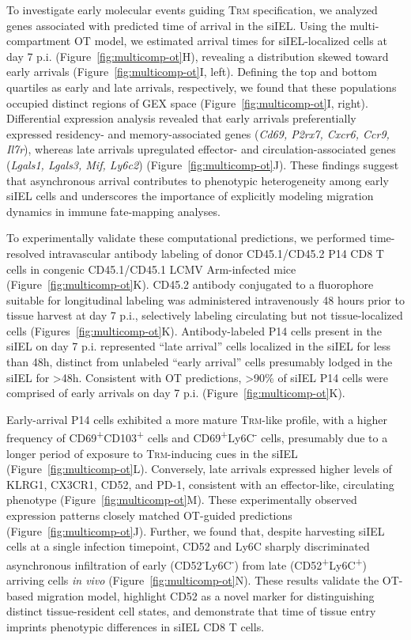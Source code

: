 To investigate early molecular events guiding T\textsc{rm} specification, we analyzed genes associated with predicted time of arrival in the siIEL. Using the multi-compartment OT model, we estimated arrival times for siIEL-localized cells at day 7 p.i. (Figure~\ref{fig:multicomp-ot}H), revealing a distribution skewed toward early arrivals (Figure~\ref{fig:multicomp-ot}I, left). Defining the top and bottom quartiles as early and late arrivals, respectively, we found that these populations occupied distinct regions of GEX space (Figure~\ref{fig:multicomp-ot}I, right). Differential expression analysis revealed that early arrivals preferentially expressed residency- and memory-associated genes (\emph{Cd69, P2rx7, Cxcr6, Ccr9, Il7r}), whereas late arrivals upregulated effector- and circulation-associated genes (\emph{Lgals1, Lgals3, Mif, Ly6c2}) (Figure~\ref{fig:multicomp-ot}J). These findings suggest that asynchronous arrival contributes to phenotypic heterogeneity among early siIEL cells and underscores the importance of explicitly modeling migration dynamics in immune fate-mapping analyses.

To experimentally validate these computational predictions, we performed time-resolved intravascular antibody labeling of donor CD45.1/CD45.2 P14 CD8 T cells in congenic CD45.1/CD45.1 LCMV Arm-infected mice (Figure~\ref{fig:multicomp-ot}K). CD45.2 antibody conjugated to a fluorophore suitable for longitudinal labeling \citep{shanahanLongitudinalIntravascularAntibody2024} was administered intravenously 48 hours prior to tissue harvest at day 7 p.i., selectively labeling circulating but not tissue-localized cells (Figures~\ref{fig:multicomp-ot}K). Antibody-labeled P14 cells present in the siIEL on day 7 p.i. represented ``late arrival'' cells localized in the siIEL for less than 48h, distinct from unlabeled ``early arrival'' cells presumably lodged in the siIEL for \textgreater{}48h. Consistent with OT predictions, \textgreater{}90\% of siIEL P14 cells were comprised of early arrivals on day 7 p.i. (Figure~\ref{fig:multicomp-ot}K).

Early-arrival P14 cells exhibited a more mature T\textsc{rm}-like profile, with a higher frequency of CD69\textsuperscript{+}CD103\textsuperscript{+} cells and CD69\textsuperscript{+}Ly6C\textsuperscript{-} cells, presumably due to a longer period of exposure to T\textsc{rm}-inducing cues in the siIEL (Figure~\ref{fig:multicomp-ot}L). Conversely, late arrivals expressed higher levels of KLRG1, CX3CR1, CD52, and PD-1, consistent with an effector-like, circulating phenotype (Figure~\ref{fig:multicomp-ot}M). These experimentally observed expression patterns closely matched OT-guided predictions (Figure~\ref{fig:multicomp-ot}J). Further, we found that, despite harvesting siIEL cells at a single infection timepoint, CD52 and Ly6C sharply discriminated asynchronous infiltration of early (CD52\textsuperscript{-}Ly6C\textsuperscript{-}) from late (CD52\textsuperscript{+}Ly6C\textsuperscript{+}) arriving cells \emph{in vivo} (Figure~\ref{fig:multicomp-ot}N). These results validate the OT-based migration model, highlight CD52 as a novel marker for distinguishing distinct tissue-resident cell states, and demonstrate that time of tissue entry imprints phenotypic differences in siIEL CD8 T cells.

